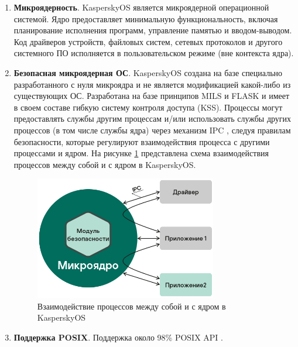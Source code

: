 \begin{enumerate}[label*=\arabic*.]
	\item \textbf{Микроядерность}. \newline
	KasperskyOS является микроядерной операционной системой. Ядро предоставляет минимальную функциональность, включая планирование исполнения программ, управление памятью и вводом-выводом. Код драйверов устройств, файловых систем, сетевых протоколов и другого системного ПО исполняется в пользовательском режиме (вне контекста ядра).
	
	\item \textbf{Безопасная микроядерная ОС}. \newline
	KasperskyOS создана на базе специально разработанного с нуля микроядра и не является модификацией какой-либо из существующих ОС. Разработана на базе принципов MILS и FLASK и имеет в своем составе гибкую систему контроля доступа (KSS). Процессы могут предоставлять службы другим процессам и/или использовать службы других процессов (в том числе службы ядра) через механизм IPC \cite{IPC_book}, следуя правилам безопасности, которые регулируют взаимодействия процесса с другими процессами и ядром. На рисунке \ref{fig:KasperskyOS} \cite{KasperskyOS_1_1_overview} представлена схема взаимодействия процессов между собой и с ядром в KasperskyOS.
	
	\begin{figure}[h]
		\centering
		\includegraphics[width=0.75\textwidth]{img/kos_ce_mils_flask.png}
		\caption{Взаимодействие процессов между собой и с ядром в KasperskyOS}
		\label{fig:KasperskyOS}
	\end{figure} 
	
	\item \textbf{Поддержка POSIX}. \newline
	Поддержка около 98\% POSIX API \cite{KasperskyOS_techdata}.
	

\end{enumerate}
